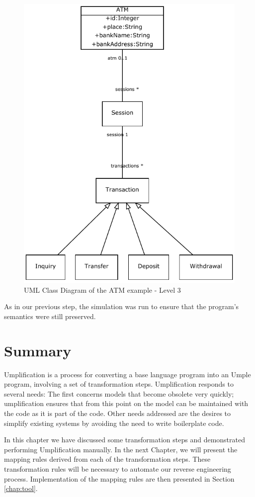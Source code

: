 \begin{figure}[!ht]
\centering
\includegraphics{Figures/Example2a3.pdf} 
\caption{UML Class Diagram of the ATM example - Level 3}
\label{fig:atmBanking3}
\end{figure}

As in our previous step, the simulation was run to ensure that the program's semantics were still preserved.

\section{Summary}

Umplification is a process for converting a base language program into an Umple program, involving a set of transformation steps. Umplification responds to several needs: The first concerns models that become obsolete very quickly; umplification ensures that from this point on the model can be maintained with the code as it is part of the code. Other needs addressed are the desires to simplify existing systems by avoiding the need to write boilerplate code.

In this chapter we have discussed some transformation steps and demonstrated performing Umplification manually. In the next Chapter, we will present the mapping rules derived from each of the transformation steps. These transformation rules will be necessary to automate our reverse engineering process. Implementation of the mapping rules are then presented in Section \ref{chap:tool}.
